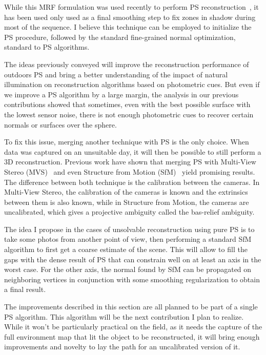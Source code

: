 While this MRF formulation was used recently to perform PS reconstruction~\cite{jung-cvpr-15}, it has been used only used as a final smoothing step to fix zones in shadow during most of the sequence. I believe this technique can be employed to initialize the PS procedure, followed by the standard fine-grained normal optimization, standard to PS algorithms.


The ideas previously conveyed will improve the reconstruction performance of outdoors PS and bring a better understanding of the impact of natural illumination on reconstruction algorithms based on photometric cues. But even if we improve a PS algorithm by a large margin, the analysis in our previous contributions showed that sometimes, even with the best possible surface with the lowest sensor noise, there is not enough photometric cues to recover certain normals or surfaces over the sphere.

To fix this issue, merging another technique with PS is the only choice. When data was captured on an unsuitable day, it will then be possible to still perform a 3D reconstruction. Previous work have shown that merging PS with Multi-View Stereo (MVS)~\cite{Beljan2012,Zhou2013,ackermann-3dv-14,HernandezEsteban2008,inose-tcva-13,shi-3dv-14} and even Structure from Motion (SfM)~\cite{zhang-iccv-03,lim-iccv-05} yield promising results. The difference between both technique is the calibration between the cameras. In Multi-View Stereo, the calibration of the cameras is known and the extrinsics between them is also known, while in Structure from Motion, the cameras are uncalibrated, which gives a projective ambiguity called the bas-relief ambiguity.

The idea I propose in the cases of unsolvable reconstruction using pure PS is to take some photos from another point of view, then performing a standard SfM algorithm to first get a coarse estimate of the scene. This will allow to fill the gaps with the dense result of PS that can constrain well on at least an axis in the worst case. For the other axis, the normal found by SfM can be propagated on neighboring vertices in conjunction with some smoothing regularization to obtain a final result.

The improvements described in this section are all planned to be part of a single PS algorithm. This algorithm will be the next contribution I plan to realize. While it won't be particularly practical on the field, as it needs the capture of the full environment map that lit the object to be reconstructed, it will bring enough improvements and novelty to lay the path for an uncalibrated version of it.

